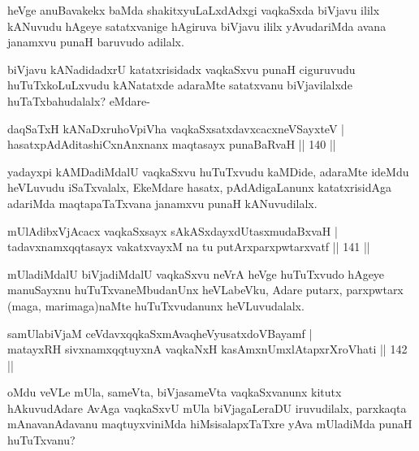 \begin{artha}
heVge anuBavakekx baMda shakitxyuLaLxdAdxgi vaqkaSxda biVjavu ililx kANuvudu hAgeye satatxvanige hAgiruva biVjavu ililx yAvudariMda avana janamxvu punaH baruvudo adilalx.

biVjavu kANadidadxrU katatxrisidadx vaqkaSxvu punaH ciguruvudu huTuTxkoLuLxvudu kANatatxde adaraMte satatxvanu biVjavilalxde huTaTxbahudalalx? eMdare-
\end{artha}

\begin{shl}
daqSaTxH kANaDxruhoV\s piVha vaqkaSxsatxdavxcacxneVSayxteV |\\
hasatxpAdAditashiCxnAnxnanx maqtasayx punaBaRvaH \hfill || 140 ||
\end{shl}

\begin{artha}
yadayxpi kAMDadiMdalU vaqkaSxvu huTuTxvudu kaMDide, adaraMte ideMdu heVLuvudu iSaTxvalalx, EkeMdare hasatx, pAdAdigaLanunx katatxrisidAga adariMda maqtapaTaTxvana janamxvu punaH kANuvudilalx.
\end{artha}


\begin{shl}
mUlAdibxVjAcacx vaqkaSxsayx sAkASxdayxdUtasxmudaBxvaH |\\
tadavxnamxqqtasayx vakatxvayxM na tu putArxparxpwtarxvatf \hfill || 141 ||
\end{shl}

\begin{artha}%
mUladiMdalU biVjadiMdalU vaqkaSxvu neVrA heVge huTuTxvudo hAgeye manuSayxnu huTuTxvaneMbudanUnx heVLabeVku, Adare putarx, parxpwtarx (maga, marimaga)naMte huTuTxvudanunx heVLuvudalalx.
\end{artha}


\begin{shl}
samUlabiVjaM ceVdavxqqkaSxmAvaqheVyusatxdoVBayamf |\\
matayxRH sivxnamxqqtuyxnA vaqkaNxH kasAmxnUmxlAtapxrXroVhati \hfill || 142 ||
\end{shl}

\begin{artha}
oMdu veVLe mUla, sameVta, biVjasameVta vaqkaSxvanunx kitutx hAkuvudAdare AvAga vaqkaSxvU mUla biVjagaLeraDU iruvudilalx, parxkaqta mAnavanAdavanu maqtuyxviniMda hiMsisalapxTaTxre yAva mUladiMda punaH huTuTxvanu?
\end{artha}


